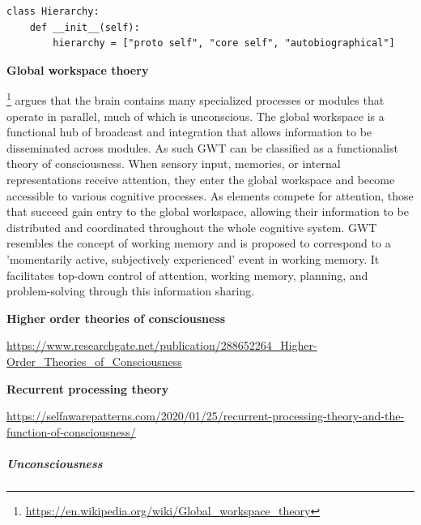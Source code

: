 \documentclass{book}
\providecommand{\ProjectDeepHeading}[2]{%
    \par\medskip\noindent\textbf{#2}\par\smallskip
}
\providecommand{\clickurlfooter}[1]{\footnote{\url{#1}}}
\begin{document}
\begin{verbatim}
class Hierarchy:
    def __init__(self):
        hierarchy = ["proto self", "core self", "autobiographical"]
\end{verbatim}

\ProjectDeepHeading{3}{Global workspace thoery}


\clickurlfooter{https://en.wikipedia.org/wiki/Global_workspace_theory} argues that the brain contains many specialized processes or modules that operate in parallel, much of which is unconscious. The global workspace is a functional hub of broadcast and integration that allows information to be disseminated across modules. As such GWT can be classified as a functionalist theory of consciousness. When sensory input, memories, or internal representations receive attention, they enter the global workspace and become accessible to various cognitive processes. As elements compete for attention, those that succeed gain entry to the global workspace, allowing their information to be distributed and coordinated throughout the whole cognitive system. GWT resembles the concept of working memory and is proposed to correspond to a 'momentarily active, subjectively experienced' event in working memory. It facilitates top-down control of attention, working memory, planning, and problem-solving through this information sharing.

\ProjectDeepHeading{3}{Higher order theories of consciousness}


\url{https://www.researchgate.net/publication/288652264_Higher-Order_Theories_of_Consciousness}

\ProjectDeepHeading{3}{Recurrent processing theory}


\url{https://selfawarepatterns.com/2020/01/25/recurrent-processing-theory-and-the-function-of-consciousness/}

\subparagraph{Unconsciousness}

\end{document}
